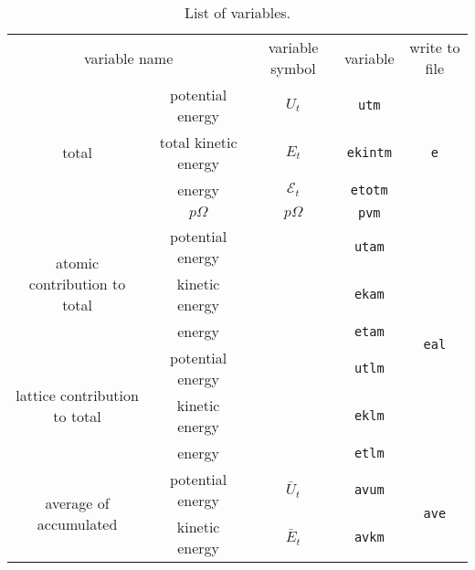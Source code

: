 \begin{table}[h]
	\centering
	\caption{List of variables.}
	\begin{tabular}{ccccc}
		\multicolumn{2}{c}{variable name} & variable symbol & variable & write to file \\
		\multirow{4}[0]{*}{total}                         & potential energy     & $U_t$           & \texttt{utm}    & \multirow{4}[0]{*}{\texttt{e}}   \\
		                                                  & total kinetic energy & $E_t$           & \texttt{ekintm} &                                  \\
		                                                  & energy               & $\mathscr{E}_t$ & \texttt{etotm}  &                                  \\
		                                                  & $p \Omega$           & $p \Omega$      & \texttt{pvm}    &                                  \\
		\multirow{3}[0]{*}{atomic contribution to total}  & potential energy     &                 & \texttt{utam}   & \multirow{6}[0]{*}{\texttt{eal}} \\
		                                                  & kinetic energy       &                 & \texttt{ekam}   &                                  \\
		                                                  & energy               &                 & \texttt{etam}   &                                  \\
		\multirow{3}[0]{*}{lattice contribution to total} & potential energy     &                 & \texttt{utlm}   &                                  \\
		                                                  & kinetic energy       &                 & \texttt{eklm}   &                                  \\
		                                                  & energy               &                 & \texttt{etlm}   &                                  \\
		\multirow{2}[0]{*}{average of accumulated}        & potential energy     & $\bar{U}_t$     & \texttt{avum}   & \multirow{2}[0]{*}{\texttt{ave}} \\
		                                                  & kinetic energy       & $\bar{E}_t$     & \texttt{avkm}   &                                  \\
	\end{tabular}%
	\label{tab:lstvar}%
\end{table}%



